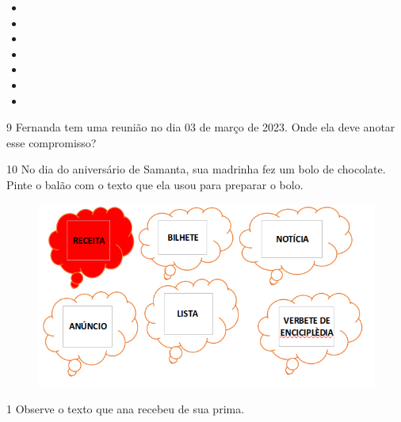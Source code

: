 
\begin{itemize}
\item {}

\item \reduline{\mbox{}\hfill}

\item \reduline{\mbox{}\hfill}

\item \reduline{\mbox{}\hfill}

\item \reduline{\mbox{}\hfill}

\item \reduline{\mbox{}\hfill}

\item \reduline{\mbox{}\hfill}
\end{itemize}

\pagebreak
\num{9} Fernanda tem uma reunião no dia 03 de março de 2023. Onde ela
deve anotar esse compromisso?


\num{10} No dia do aniversário de Samanta, sua madrinha fez um bolo de
chocolate. Pinte o balão com o texto que ela usou para preparar o bolo.

\begin{figure}[htpb!]
\includegraphics[width=\textwidth]{media/confederado.png}
\end{figure}

\pagebreak
{}

\num{1} Observe o texto que ana recebeu de sua prima.

